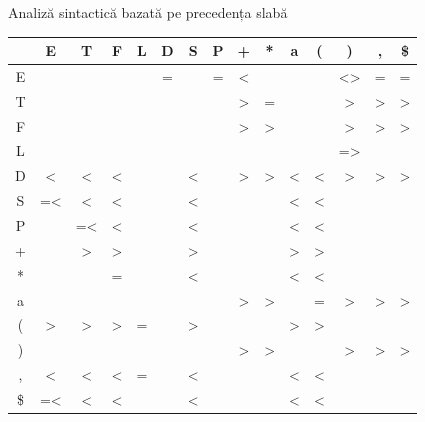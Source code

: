 \documentclass[pdf]{beamer}
\begin{document}
\begin{frame}{Analiză sintactică bazată pe precedența slabă}
\begin{center}
\scriptsize
\setlength{\tabcolsep}{4pt}
\begin{table}
\begin{tabular}{| c | c | c | c | c | c | c | c | c | c | c | c | c | c | c | }
\hline
        &\color{blue}E&\color{blue}T&\color{blue}F&\color{blue}L&\color{blue}D&\color{blue}S&\color{blue}P&\color{blue}+&\color{blue}\color{blue}*&\color{blue}a&\color{blue}(&\color{blue})&\color{blue},&\color{blue}\$\\
        \hline
        \color{blue}E&&&&&\color{red}=
        &&\color{red}=&\color{red}<
        &&&&\color{red}<>&\color{red}=&\color{red}=\\
        \hline
        \color{blue}T&&&&&&&&\color{red}>&\color{red}=&&&\color{red}>&\color{red}>&\color{red}>\\
        \hline
        \color{blue}F&&&&&&&&\color{red}>&\color{red}>&&&\color{red}>&\color{red}>&\color{red}>\\
        \hline
        \color{blue}L&&&&&&&&&&&&\color{red}=>&&\\
        \hline
        \color{blue}D&\color{red}<&\color{red}<
        &\color{red}<&&&\color{red}<&&\color{red}>&\color{red}>&\color{red}<&\color{red}<&\color{red}>&\color{red}>&\color{red}>\\
        \hline
        \color{blue}S&\color{red}=<&\color{red}<&\color{red}<&&&\color{red}<&&&&\color{red}<&\color{red}<&&&\\
        \hline
        \color{blue}P&&\color{red}=<&\color{red}<&&&\color{red}<&&&&\color{red}<&\color{red}<&&&\\
        \hline
        \color{blue}+&&\color{red}>&\color{red}>&&&\color{red}>&&&&\color{red}>&\color{red}>&&&\\
        \hline
        \color{blue}*&&&\color{red}=&&&\color{red}<&&&&\color{red}<&\color{red}<&&&\\
        \hline
        \color{blue}a&&&&&&&&\color{red}>&\color{red}>&&\color{red}=&\color{red}>&\color{red}>&\color{red}>\\
        \hline
        \color{blue}(&\color{red}>&\color{red}>&\color{red}>&\color{red}=&&\color{red}>&&&&\color{red}>&\color{red}>&&&\\
        \hline
        \color{blue})&&&&&&&&\color{red}>&\color{red}>&&&\color{red}>&\color{red}>&\color{red}>\\
        \hline
        \color{blue},&\color{red}<&\color{red}<&\color{red}<&\color{red}=&&\color{red}<&&&&\color{red}<&\color{red}<&&&\\
        \hline
        \color{blue}\$&\color{red}=<&\color{red}<&\color{red}<&&&\color{red}<&&&&\color{red}<&\color{red}<&&&\\
        \hline


\end{tabular}
\end{table}
\end{center}
\end{frame}
\end{document}
